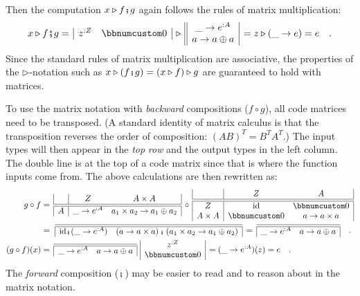 Then the computation $x\triangleright f\bef g$ again follows the
rules of matrix multiplication:
\[
x\triangleright f\bef g=\,\begin{array}{|cc|}
z^{:Z} & \bbnum 0\end{array}\,\triangleright\,\begin{array}{||c|}
\_\rightarrow e^{:A}\\
a\rightarrow a\oplus a
\end{array}\,=z\triangleright(\_\rightarrow e)=e\quad.
\]
Since the standard rules of matrix multiplication are associative,
the properties of the $\triangleright$-notation such as $x\triangleright(f\bef g)=(x\triangleright f)\triangleright g$
are guaranteed to hold with matrices.

To use the matrix notation with \emph{backward} compositions ($f\circ g$),
all code matrices need to be transposed. (A standard identity of matrix
calculus is that the transposition reverses the order of composition:
$\left(AB\right)^{T}=B^{T}A^{T}$.) The input types will then appear
in the \emph{top} \emph{row} and the output types in the left column.
The double line is at the top of a code matrix since that is where
the function inputs come from. The above calculations are then rewritten
as:
\begin{align*}
g\circ f & =\,\begin{array}{|c|cc|}
 & Z & A\times A\\
\hline\hline A & \_\rightarrow e^{:A} & a_{1}\times a_{2}\rightarrow a_{1}\oplus a_{2}
\end{array}\,\circ\,\begin{array}{|c|cc|}
 & Z & A\\
\hline\hline Z & \text{id} & \bbnum 0\\
A\times A & \bbnum 0 & a\rightarrow a\times a
\end{array}\\
 & =\,\,\begin{array}{|cc|}
\hline\hline \text{id}\bef(\_\rightarrow e^{:A}) & \left(a\rightarrow a\times a\right)\bef\left(a_{1}\times a_{2}\rightarrow a_{1}\oplus a_{2}\right)\end{array}\,=\,\begin{array}{|cc|}
\hline\hline \_\rightarrow e^{:A} & a\rightarrow a\oplus a\end{array}\quad.\\
(g\circ f)(x) & =\,\begin{array}{|cc|}
\hline\hline \_\rightarrow e^{:A} & a\rightarrow a\oplus a\end{array}\,\,\begin{array}{|c|}
z^{:Z}\\
\bbnum 0
\end{array}\,=(\_\rightarrow e^{:A})(z)=e\quad.
\end{align*}
The \emph{forward} composition ($\bef$) may be easier to read and
to reason about in the matrix notation.

